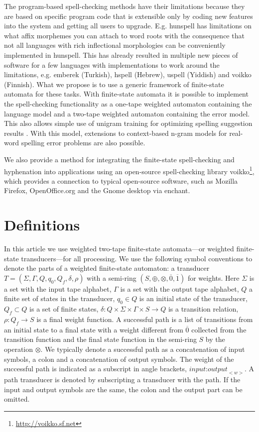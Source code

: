 \documentclass[a4paper,conference]{IEEEtran}
\begin{document}
The program-based spell-checking methods have their limitations
because they are based on specific program code that is extensible
only by coding new features into the system and getting all users to
upgrade. E.g. hunspell has limitations on what affix morphemes you can
attach to word roots with the consequence that not all languages with
rich inflectional morphologies can be conveniently implemented in
hunspell. This has already resulted in multiple new pieces of software
for a few languages with implementations to work around the
limitations, e.g.  emberek (Turkish), hspell (Hebrew), uspell
(Yiddish) and voikko (Finnish). What we propose is to use a generic
framework of finite-state automata for these tasks. With finite-state
automata it is possible to implement the spell-checking functionality
as a one-tape weighted automaton containing the language model and a
two-tape weighted automaton containing the error model. This also
allows simple use of unigram training for optimizing spelling suggestion
results \cite{conf/lrec/Pirinen2010}. With this model, extensions to
context-based n-gram models for real-word spelling error problems
\cite{DBLP:conf/cicling/Wilcox-OHearnHB08} are also possible.

We also provide a method for integrating the finite-state spell-checking
and hyphenation into applications using an open-source spell-checking
library voikko\footnote{\url{http://voikko.sf.net}}, which provides a
connection to typical open-source software, such as Mozilla Firefox,
OpenOffice.org and the Gnome desktop via enchant.

\section{Definitions}
\label{sec:definitions}

In this article we use weighted two-tape finite-state automata---or
weighted finite-state transducers---for all processing. We use the
following symbol conventions to denote the parts of a weighted
finite-state automaton: a transducer $T = (\Sigma, \Gamma, Q, q_0,
Q_f, \delta, \rho)$ with a semi-ring $(S, \oplus, \otimes,
\overline{0}, \overline{1})$ for weights. Here $\Sigma$ is a set with
the input tape alphabet, $\Gamma$ is a set with the output tape
alphabet, $Q$ a finite set of states in the transducer, $q_0 \in Q$ is
an initial state of the transducer, $Q_f \subset Q$ is a set of finite
states, $\delta: Q \times \Sigma \times \Gamma \times S \rightarrow Q$
is a transition relation, $\rho: Q_f \rightarrow S$ is a final weight
function. A successful path is a list of transitions from an initial
state to a final state with a weight different from $\overline{0}$
collected from the transition function and the final state function in
the semi-ring $S$ by the operation $\otimes$. We typically denote a
successful path as a concatenation of input symbols, a colon and a
concatenation of output symbols. The weight of the successful path is
indicated as a subscript in angle brackets,
$\textit{input:output}_{<w>}$. A path transducer is denoted by
subscripting a transducer with the path.  If the input and output
symbols are the same, the colon and the output part can be omitted.
\end{document}
